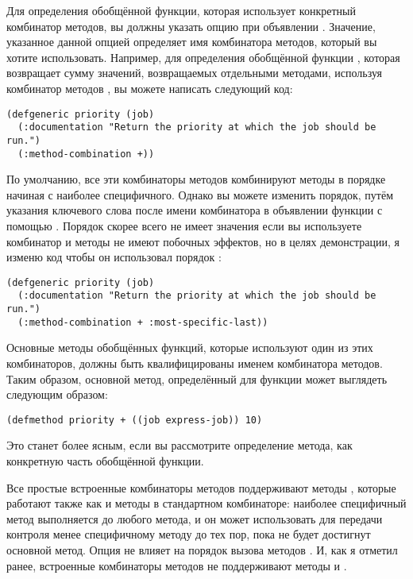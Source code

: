 Для определения обобщённой функции, которая использует конкретный комбинатор методов, вы
должны указать опцию  при объявлении .
Значение, указанное данной опцией определяет имя комбинатора методов, который вы хотите
использовать.  Например, для определения обобщённой функции , которая
возвращает сумму значений, возвращаемых отдельными методами, используя комбинатор методов
\code{+}, вы можете написать следующий код:

\begin{lstlisting}
(defgeneric priority (job)
  (:documentation "Return the priority at which the job should be run.")
  (:method-combination +))
\end{lstlisting}

По умолчанию, все эти комбинаторы методов комбинируют методы в порядке начиная с наиболее
специфичного.  Однако вы можете изменить порядок, путём указания ключевого слова
 после имени комбинатора в объявлении функции с помощью
.  Порядок скорее всего не имеет значения если вы используете комбинатор
\code{+} и методы не имеют побочных эффектов, но в целях демонстрации, я изменю код
 чтобы он использовал порядок :

\begin{lstlisting}
(defgeneric priority (job)
  (:documentation "Return the priority at which the job should be run.")
  (:method-combination + :most-specific-last))
\end{lstlisting}

Основные методы обобщённых функций, которые используют один из этих комбинаторов, должны
быть квалифицированы именем комбинатора методов.  Таким образом, основной метод,
определённый для функции  может выглядеть следующим образом:

\begin{lstlisting}
(defmethod priority + ((job express-job)) 10)
\end{lstlisting}

Это станет более ясным, если вы рассмотрите определение метода, как конкретную часть
обобщённой функции.

Все простые встроенные комбинаторы методов поддерживают методы , которые
работают также как и методы  в стандартном комбинаторе: наиболее специфичный
метод  выполняется до любого метода, и он может использовать
 для передачи контроля менее специфичному методу  до
тех пор, пока не будет достигнут основной метод.  Опция  не
влияет на порядок вызова методов .  И, как я отметил ранее, встроенные
комбинаторы методов не поддерживают методы  и .

